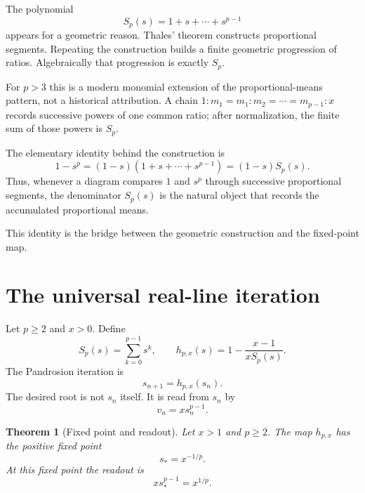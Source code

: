 \documentclass[10pt,a4paper]{article}
\theoremstyle{plain}
\newtheorem{theorem}{Theorem}[section]
\theoremstyle{definition}
\theoremstyle{remark}
\newcommand{\Sp}{S_p}
\newcommand{\hp}{h_{p,x}}
\begin{document}
The polynomial
\[
  \Sp(s)=1+s+\cdots+s^{p-1}
\]
appears for a geometric reason.  Thales' theorem constructs proportional
segments.  Repeating the construction builds a finite geometric progression of
ratios.  Algebraically that progression is exactly $\Sp$.

For $p>3$ this is a modern monomial extension of the proportional-means pattern,
not a historical attribution.  A chain
$1:m_1=m_1:m_2=\cdots=m_{p-1}:x$ records successive powers of one common ratio;
after normalization, the finite sum of those powers is $S_p$.

The elementary identity behind the construction is
\begin{equation}
  1-s^p=(1-s)(1+s+\cdots+s^{p-1})=(1-s)\Sp(s).
  \label{eq:telescopic-Sp}
\end{equation}
Thus, whenever a diagram compares $1$ and $s^p$ through successive proportional
segments, the denominator $\Sp(s)$ is the natural object that records the
accumulated proportional means.

This identity is the bridge between the geometric construction and the
fixed-point map.

\section{The universal real-line iteration}
\label{sec:general}

Let $p\ge 2$ and $x>0$.  Define
\begin{equation}
  \Sp(s)=\sum_{k=0}^{p-1}s^k,
  \qquad
  \hp(s)=1-\frac{x-1}{x\Sp(s)}.
  \label{eq:hp-def}
\end{equation}
The Pandrosion iteration is
\begin{equation}
  s_{n+1}=\hp(s_n).
  \label{eq:pandrosion-iteration}
\end{equation}
The desired root is not $s_n$ itself.  It is read from $s_n$ by
\begin{equation}
  v_n=x s_n^{p-1}.
  \label{eq:readout}
\end{equation}

\begin{theorem}[Fixed point and readout]
\label{thm:fixed-point}
Let $x>1$ and $p\ge 2$.  The map $\hp$ has the positive fixed point
\[
  s_*=x^{-1/p}.
\]
At this fixed point the readout is
\[
  x s_*^{p-1}=x^{1/p}.
\]
\end{theorem}
\end{document}
